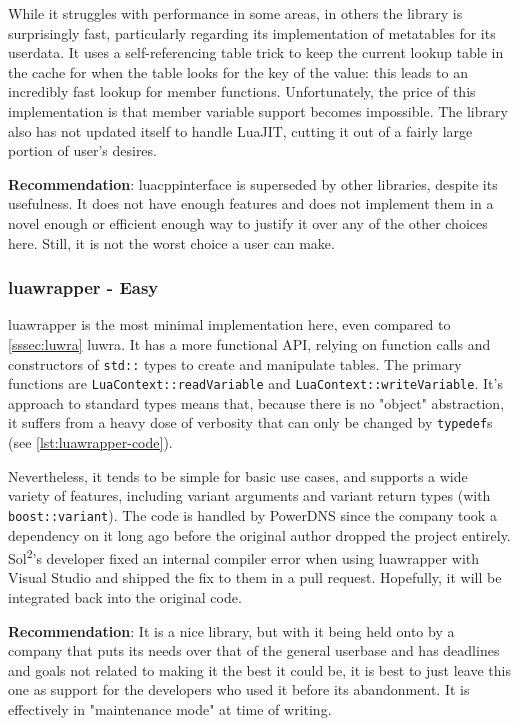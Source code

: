 \documentclass[conference,compsoc]{IEEEtran}
\newcommand{\soltwo}{Sol\textsuperscript{2}}
\begin{document}
While it struggles with performance in some areas, in others the library is surprisingly fast, particularly regarding its implementation of metatables for its userdata. It uses a self-referencing table trick to keep the current lookup table in the cache for when the table looks for the key of the value: this leads to an incredibly fast lookup for member functions. Unfortunately, the price of this implementation is that member variable support becomes impossible. The library also has not updated itself to handle LuaJIT, cutting it out of a fairly large portion of user's desires.

\textbf{Recommendation}: luacppinterface is superseded by other libraries, despite its usefulness. It does not have enough features and does not implement them in a novel enough or efficient enough way to justify it over any of the other choices here. Still, it is not the worst choice a user can make.

\subsubsection{luawrapper - Easy}

luawrapper\cite{luawrapper} is the most minimal implementation here, even compared to \cref{sssec:luwra} luwra. It has a more functional API, relying on function calls and constructors of \lstinline|std::| types to create and manipulate tables. The primary functions are \lstinline|LuaContext::readVariable| and \lstinline|LuaContext::writeVariable|. It's approach to standard types means that, because there is no "object" abstraction, it suffers from a heavy dose of verbosity that can only be changed by \lstinline|typedef|s (see \cref{lst:luawrapper-code}).

Nevertheless, it tends to be simple for basic use cases, and supports a wide variety of features, including variant arguments and variant return types (with \lstinline|boost::variant|).  The code is handled by PowerDNS since the company took a dependency on it long ago before the original author dropped the project entirely. \soltwo{}'s developer fixed an internal compiler error when using luawrapper with Visual Studio and shipped the fix to them in a pull request. Hopefully, it will be integrated back into the original code.

\textbf{Recommendation}: It is a nice library, but with it being held onto by a company that puts its needs over that of the general userbase and has deadlines and goals not related to making it the best it could be, it is best to just leave this one as support for the developers who used it before its abandonment. It is effectively in "maintenance mode" at time of writing.
\end{document}
